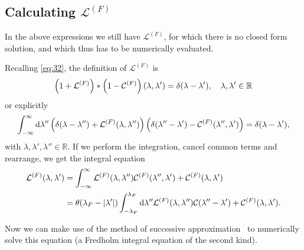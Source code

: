 \documentclass[11pt, a4paper]{report} %
\begin{document}
\subsection{Calculating \(\mathcal{L}^{(F)}\)}

In the above expressions we still have \(\mathcal{L}^{(F)}\), for which there is no closed form solution, and which thus has to be numerically evaluated.

Recalling \cref{eq:32}, the definition of \(\mathcal{L}^{(F)}\) is~\cite{Caux2015}
\begin{equation}
	\left(1 + \mathcal{L}^{(F)}\right) * \left(1 - \mathcal{C}^{(F)}\right)\qty(\lambda,\lambda')=\delta\qty(\lambda-\lambda'), \quad \lambda, \lambda' \in \mathbb{R}
\end{equation}
or explicitly
\begin{equation}
	\int_{-\infty}^{\infty} \dd \lambda'' \left( \delta\qty(\lambda-\lambda'') + \mathcal{L}^{(F)}\qty(\lambda,\lambda'')\right)\left(\delta\qty(\lambda''-\lambda') - \mathcal{C}^{(F)}\qty(\lambda'',\lambda')\right) = \delta\qty(\lambda-\lambda'),
\end{equation}
with  \(\lambda, \lambda', \lambda'' \in \mathbb{R}\).
If we perform the integration, cancel common terms and rearrange, we get the integral equation
\begin{align}
	\mathcal{L}^{(F)}\qty(\lambda,\lambda') &= \int_{-\infty}^{\infty} \mathcal{L}^{(F)}\qty(\lambda,\lambda'') \mathcal{C}^{(F)}\qty(\lambda'',\lambda') + \mathcal{C}^{(F)}\qty(\lambda,\lambda')\\
	&= \theta\qty(\lambda_F - \abs{\lambda'}) \int_{-\lambda_F}^{\lambda_F} \dd \lambda'' \mathcal{L}^{(F)}\qty(\lambda,\lambda'') \mathcal{C}\qty(\lambda''-\lambda') + \mathcal{C}^{(F)}\qty(\lambda,\lambda').
\end{align}

Now we can make use of the method of successive approximation~\cite{Zemyan2012} to numerically solve this equation (a Fredholm integral equation of the second kind).
\end{document}
